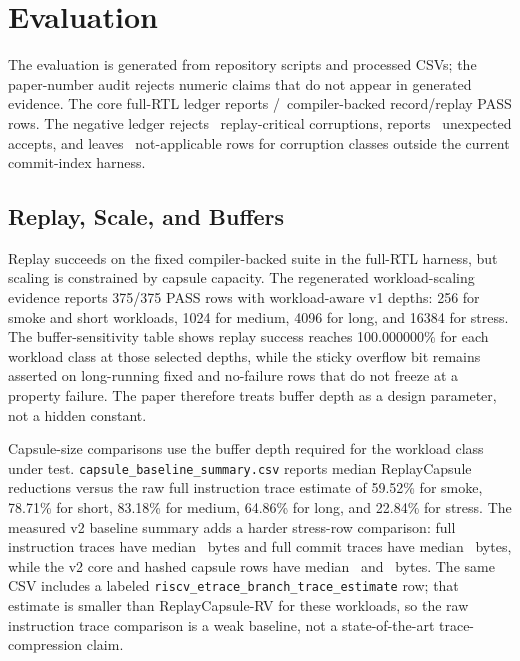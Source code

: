 \section{Evaluation}
\label{sec:evaluation}

The evaluation is generated from repository scripts and processed CSVs; the paper-number audit rejects numeric claims that do not appear in generated evidence. The core full-RTL ledger reports \rcFullReplayPass/\rcFullReplayTotal\ compiler-backed record/replay PASS rows. The negative ledger rejects \rcNegativeReject\ replay-critical corruptions, reports \rcNegativeUnexpectedAccept\ unexpected accepts, and leaves \rcNegativeNA\ not-applicable rows for corruption classes outside the current commit-index harness.

\subsection{Replay, Scale, and Buffers}

Replay succeeds on the fixed compiler-backed suite in the full-RTL harness, but scaling is constrained by capsule capacity. The regenerated workload-scaling evidence reports 375/375 PASS rows with workload-aware v1 depths: 256 for smoke and short workloads, 1024 for medium, 4096 for long, and 16384 for stress. The buffer-sensitivity table shows replay success reaches 100.000000\% for each workload class at those selected depths, while the sticky overflow bit remains asserted on long-running fixed and no-failure rows that do not freeze at a property failure. The paper therefore treats buffer depth as a design parameter, not a hidden constant.

Capsule-size comparisons use the buffer depth required for the workload class under test. \texttt{capsule\_baseline\_summary.csv} reports median ReplayCapsule reductions versus the raw full instruction trace estimate of 59.52\% for smoke, 78.71\% for short, 83.18\% for medium, 64.86\% for long, and 22.84\% for stress. The measured v2 baseline summary adds a harder stress-row comparison: full instruction traces have median \rcVTwoStressFullInstructionBytes\ bytes and full commit traces have median \rcVTwoStressFullCommitBytes\ bytes, while the v2 core and hashed capsule rows have median \rcVTwoStressCoreBytes\ and \rcVTwoStressHashedBytes\ bytes. The same CSV includes a labeled \texttt{riscv\_etrace\_branch\_trace\_estimate} row; that estimate is smaller than ReplayCapsule-RV for these workloads, so the raw instruction trace comparison is a weak baseline, not a state-of-the-art trace-compression claim.

